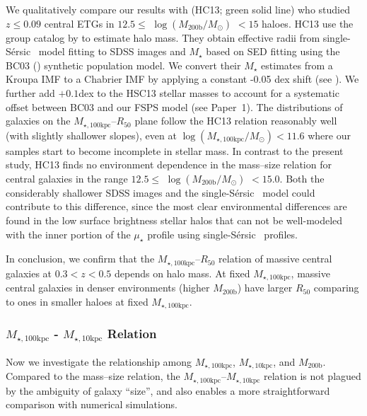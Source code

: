 \documentclass[a4paper,fleqn,usenatbib]{mnras}
\def\ser{{S\'{e}rsic\ }}
\def\mstar{{$M_{\star}$}}
\def\mhalo{{$M_{\mathrm{200b}}$}}
\def\logmh{{$\log (M_{\mathrm{200b}}/M_{\odot})$}}
\def\minn{{$M_{\star,10\mathrm{kpc}}$}}
\def\mtot{{$M_{\star,100\mathrm{kpc}}$}}
\def\logmtot{{$\log (M_{\star,100\mathrm{kpc}}/M_{\odot})$}}
\def\mden{{$\mu_{\star}$}}
\begin{document}
    We qualitatively compare our results with \citealt{HCompany13} (HC13; 
    green solid line) who studied $z\leq 0.09$ central ETGs in 
    $12.5 \le$ \logmh{} $< 15$ haloes. 
    HC13 use the group catalog by \citet{Yang2007} to estimate halo mass. 
    They obtain effective radii from single-\ser{} model fitting to SDSS 
    images and \mstar{} based on SED fitting using the BC03 (\citealt{BC03}) 
    synthetic population model. 
    We convert their \mstar{} estimates from a Kroupa IMF to a Chabrier 
    IMF by applying a constant -0.05 dex shift (see \citealt{Bernardi2016a}). 
    We further add $+0.1$dex to the HSC13 stellar masses to account for a systematic 
    offset between BC03 and our FSPS model (see Paper~1). 
    The distributions of galaxies on the 
    \mtot{}--$R_{\mathrm{50}}$ plane follow the HC13 relation reasonably well 
    (with slightly shallower slopes), even at \logmtot{}$< 11.6$ where our samples 
    start to become incomplete in stellar mass. 
    In contrast to the present study, HC13 finds no environment dependence in the 
    mass--size relation for central galaxies in the range $12.5\le$ \logmh{} $<15.0$.     
    Both the considerably shallower SDSS images and the single-\ser{} model could 
    contribute to this difference, since the most clear environmental differences 
    are found in the low surface brightness stellar halos that can not be 
    well-modeled with the inner portion of the \mden{} profile using single-\ser{}
    profiles. 

    In conclusion, we confirm that the \mtot{}--$R_{\mathrm{50}}$ relation of massive
    central galaxies at $0.3 < z < 0.5$ depends on halo mass. 
    At fixed \mtot{}, massive central galaxies in denser environments (higher \mhalo{}) 
    have larger $R_{\mathrm{50}}$ comparing to ones in smaller haloes at fixed 
    \mtot{}. 
    
\subsubsection{\mtot{} - \minn{} Relation}
    \label{sssec:m100_m10}
    
    Now we investigate the relationship among \mtot{}, \minn{}, and \mhalo{}. 
    Compared to the mass--size relation, the \mtot{}--\minn{} relation is not plagued 
    by the ambiguity of galaxy ``size'', and also enables a more straightforward 
    comparison with numerical simulations.
    
\end{document}
